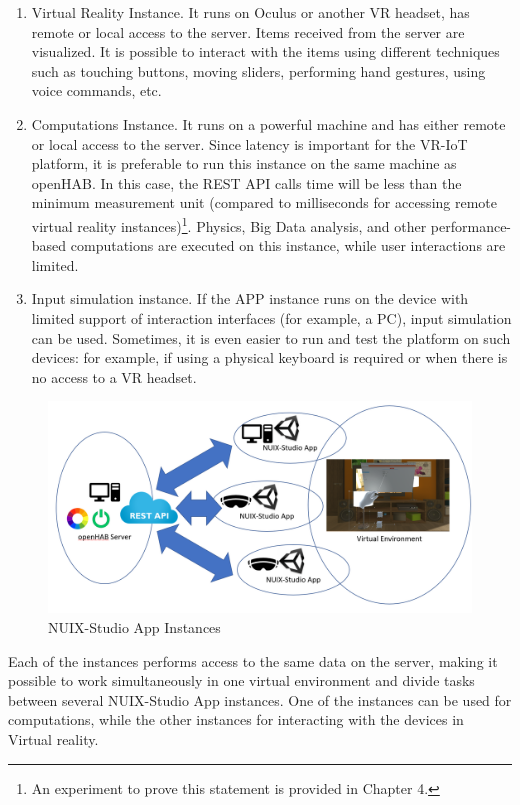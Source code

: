 \begin{enumerate}
    \item Virtual Reality Instance. It runs on Oculus or another VR headset, has remote or local access to the server. Items received from the server are visualized. It is possible to interact with the items using different techniques such as touching buttons, moving sliders, performing hand gestures, using voice commands, etc. 
    \item Computations Instance. It runs on a powerful machine and has either remote or local access to the server. Since latency is important for the VR-IoT platform, it is preferable to run this instance on the same machine as openHAB. In this case, the REST API calls time will be less than the minimum measurement unit (compared to milliseconds for accessing remote virtual reality instances)\footnote{An experiment to prove this statement is provided in Chapter 4.}. Physics, Big Data analysis, and other performance-based computations are executed on this instance, while user interactions are limited.
    \item Input simulation instance. If the APP instance runs on the device with limited support of interaction interfaces (for example, a PC), input simulation can be used. Sometimes, it is even easier to run and test the platform on such devices: for example, if using a physical keyboard is required or when there is no access to a VR headset.
\end{enumerate}

\begin{figure}
  \centering
  \includegraphics[width=0.9\linewidth]{figures/AppInstances.png}
  \caption{NUIX-Studio App Instances}
  \label{fig:AppInstances-figure}
\end{figure}

Each of the instances performs access to the same data on the server, making it possible to work simultaneously in one virtual environment and divide tasks between several NUIX-Studio App instances. One of the instances can be used for computations, while the other instances for interacting with the devices in Virtual reality.

